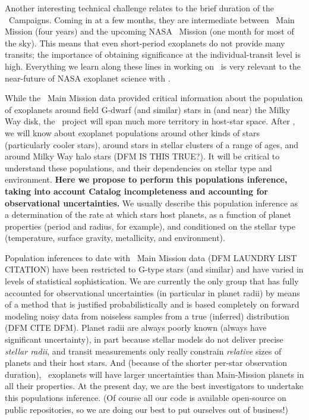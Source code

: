 \documentclass[12pt,preprint]{aastex}
\begin{document}
Another interesting technical challenge relates to the brief duration
of the \kt\ Campaigns.
Coming in at a few months, they are intermediate between \kepler\ Main
Mission (four years) and the upcoming NASA \tess\ Mission (one month for most of the sky).
This means that even short-period exoplanets do not provide many
transits; the importance of obtaining significance at the
individual-transit level is high.
Everything we learn along these lines in working on \kt\ is very
relevant to the near-future of NASA exoplanet science with \tess.

While the \kepler\ Main Mission data provided critical information
about the population of exoplanets around field G-dwarf (and similar) stars
in (and near) the Milky Way disk, the \kt\ project will span much more
territory in host-star space.
After \kt, we will know about exoplanet populations around other kinds
of stars (particularly cooler stars), around stars in stellar clusters
of a range of ages, and around Milky Way halo stars (DFM IS THIS TRUE?).
It will be critical to understand these populations, and their
dependencies on stellar type and environment.
\textbf{Here we propose to perform this populations inference, taking
  into account Catalog incompleteness and accounting for observational
  uncertainties.}
We usually describe this population inference as a determination of the
rate at which stars host planets, as a function of planet properties
(period and radius, for example), and conditioned on the stellar type
(temperature, surface gravity, metallicity, and environment).

Population inferences to date with \kepler\ Main Mission data (DFM LAUNDRY LIST CITATION) have
been restricted to G-type stars (and similar) and have varied in
levels of statistical sophistication.
We are currently the only group that has fully accounted for
observational uncertainties (in particular in planet radii) by means
of a method that is justified probabilistically and is based
completely on forward modeling noisy data from noiseless samples from
a true (inferred) distribution (DFM CITE DFM).
Planet radii are always poorly known (always have significant
uncertainty), in part because stellar models do not deliver precise
\emph{stellar radii}, and transit measurements only really constrain
\emph{relative} sizes of planets and their host stars.
And (because of the shorter per-star observation duration),
\kt\ exoplanets will have larger uncertainties than Main-Mission
planets in all their properties.
At the present day, we are the best investigators to undertake this
populations inference.
(Of course all our code is available open-source on public
 repositories, so we are doing our best to put
ourselves out of business!)
\end{document}
